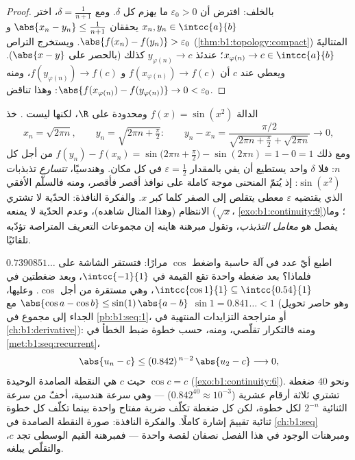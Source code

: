 \begin{proof}
بالخلف: افترض أن $\varepsilon_0 > 0$ ما يهزم كل
$\delta$. ومع $\delta = \frac{1}{n+1}$، اختر $x_n, y_n \in
\intcc{a}{b}$ يحققان $\abs{x_n - y_n} \leq \frac{1}{n+1}$ و
$\abs{f(x_n) - f(y_n)} > \varepsilon_0$. ويستخرج التراص
(\cref{thm:b1:topology:compact}) المتتاليةَ $x_{\varphi(n)} \to c \in
\intcc{a}{b}$؛ عندئذ $y_{\varphi(n)} \to c$ كذلك (بالحصر على $\abs{x -
y}$). ويعطي  عند $c$ أن $f(x_{\varphi(n)}) \to f(c)$ و
$f(y_{\varphi(n)}) \to f(c)$، ومنه $\abs{f(x_{\varphi(n)}) -
f(y_{\varphi(n)})} \to 0 < \varepsilon_0$: وهذا تناقض.
\end{proof}

\begin{example}\label{ex:b1:continuity:sinx2}
الدالة $f(x) = \sin(x^2)$  ومحدودة على
$\R$، لكنها ليست . خذ
\[
x_n = \sqrt{2\pi n}, \qquad y_n = \sqrt{2\pi n + \tfrac\pi2}:
\qquad
y_n - x_n = \frac{\pi/2}{\sqrt{2\pi n + \frac\pi2} +
\sqrt{2\pi n}} \longrightarrow 0 ,
\]
ومع ذلك $f(y_n) - f(x_n) = \sin\bigl(2\pi n + \frac\pi2\bigr) -
\sin(2\pi n) = 1 - 0 = 1$ من أجل كل $n$: فلا $\delta$ واحد يستطيع
أن يفي بالمقدار $\varepsilon = \frac12$ في كل مكان. وهندسيًا،
\emph{تتسارع} تذبذبات $\sin(x^2)$: إذ يُتمّ المنحنى
موجة كاملة على نوافذ أقصر فأقصر، ومنه فالسلّم
الأفقي الذي يقتضيه $\varepsilon$ معطى يتقلص إلى الصفر
كلما كبر $x$. والفكرة النافذة: الحدّية لا تشتري
الانتظام (وهذا المثال شاهده)، وعدم الحدّية لا يمنعه
($\sqrt x$، \cref{exo:b1:continuity:9})؛ وما يفصل هو
\emph{معامل التذبذب}، وتقول مبرهنة هاينه إن مجموعات التعريف
المتراصة تؤدّبه تلقائيًا.
\end{example}

\begin{example}\label{ex:b1:continuity:cositeration}
اطبع أيّ عدد في آلة حاسبة واضغط $\cos$ مرارًا:
فتستقر الشاشة على $0.7390851\dots$ فلماذا؟ بعد ضغطة واحدة تقع
القيمة في $\intcc{-1}{1}$، وبعد ضغطتين في $\intcc{\cos 1}{1}
\subseteq \intcc{0.54}{1}$، وهي  مستقرة من أجل $\cos$. وعليها،
$\abs{\cos a - \cos b} \leq \sin(1)\,\abs{a - b}$ مع $\sin 1 =
0.841\dots < 1$ (وهو حاصر تحويل الجداء إلى مجموع في
\cref{pb:b1:seq:1}، أو متراجحة التزايدات المنتهية في
\cref{ch:b1:derivative}): ومنه فالتكرار تقلّصي، ومنه، حسب
خطوة ضبط الخطأ في \cref{met:b1:seq:recurrent}،
\[
\abs{u_n - c} \leq (0.842)^{\,n-2}\,\abs{u_2 - c}
\longrightarrow 0 ,
\]
حيث $c$ هي النقطة الصامدة الوحيدة $\cos c = c$
(\cref{exo:b1:continuity:6}). ونحو $40$ ضغطة تشتري ثلاثة
أرقام عشرية ($0.842^{40} \approx 10^{-3}$) --- وهي سرعة هندسية،
أخفّ من سرعة الثنائية $2^{-n}$ لكل خطوة، لكن كل ضغطة تكلّف
ضربة مفتاح واحدة بينما تكلّف كل خطوة ثنائية تقييمَ إشارة
كاملًا. والفكرة النافذة: صورة النقطة الصامدة في
\cref{ch:b1:seq} ومبرهنات الوجود في هذا الفصل
نصفان لقصة واحدة --- فمبرهنة القيم الوسطى تجد $c$، والتقلّص يبلغه.
\end{example}

